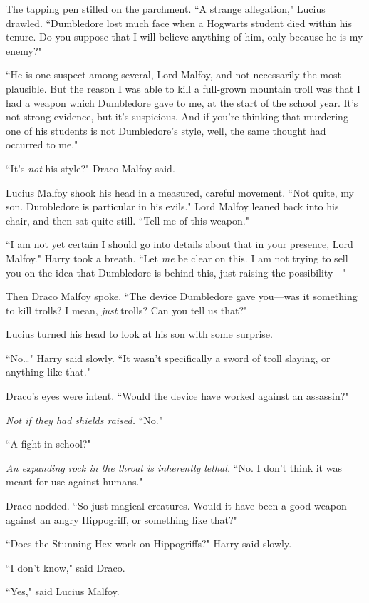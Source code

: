 The tapping pen stilled on the parchment. ``A strange allegation," Lucius drawled. ``Dumbledore lost much face when a Hogwarts student died within his tenure. Do you suppose that I will believe anything of him, only because he is my enemy?"

``He is one suspect among several, Lord Malfoy, and not necessarily the most plausible. But the reason I was able to kill a full-grown mountain troll was that I had a weapon which Dumbledore gave to me, at the start of the school year. It's not strong evidence, but it's suspicious. And if you're thinking that murdering one of his students is not Dumbledore's style, well, the same thought had occurred to me."

``It's \emph{not} his style?" Draco Malfoy said.

Lucius Malfoy shook his head in a measured, careful movement. ``Not quite, my son. Dumbledore is particular in his evils." Lord Malfoy leaned back into his chair, and then sat quite still. ``Tell me of this weapon."

``I am not yet certain I should go into details about that in your presence, Lord Malfoy." Harry took a breath. ``Let \emph{me} be clear on this. I am not trying to sell you on the idea that Dumbledore is behind this, just raising the possibility—"

Then Draco Malfoy spoke. ``The device Dumbledore gave you—was it something to kill trolls? I mean, \emph{just} trolls? Can you tell us that?"

Lucius turned his head to look at his son with some surprise.

``No{\ldots}" Harry said slowly. ``It wasn't specifically a sword of troll slaying, or anything like that."

Draco's eyes were intent. ``Would the device have worked against an assassin?"

\emph{Not if they had shields raised.} ``No."

``A fight in school?"

\emph{An expanding rock in the throat is inherently lethal.} ``No. I don't think it was meant for use against humans."

Draco nodded. ``So just magical creatures. Would it have been a good weapon against an angry Hippogriff, or something like that?"

``Does the Stunning Hex work on Hippogriffs?" Harry said slowly.

``I don't know," said Draco.

``Yes," said Lucius Malfoy.

